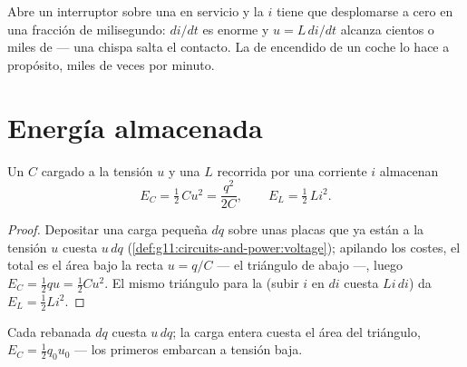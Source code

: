 \begin{remark}\label{rem:g12:rc-rl-circuits:spark}
Abre un interruptor sobre una  en servicio y la $i$ tiene que desplomarse a cero
en una fracción de milisegundo: $di/dt$ es enorme y $u = L\,di/dt$ alcanza cientos o
miles de  --- una chispa salta el contacto. La  de encendido de un coche
lo hace a propósito, miles de veces por minuto.
\end{remark}

\section{Energía almacenada}

\begin{proposition}\label{prop:g12:rc-rl-circuits:energy}
Un  $C$ cargado a la tensión $u$ y una  $L$ recorrida por una
corriente $i$ almacenan
\[
E_C = \tfrac12\,C u^2 = \frac{q^2}{2C},
\qquad
E_L = \tfrac12\,L i^2 .
\]
\end{proposition}

\begin{proof}
Depositar una carga pequeña $dq$ sobre unas placas que ya están a la tensión $u$
cuesta $u\,dq$ (\cref{def:g11:circuits-and-power:voltage}); apilando los costes, el
total es el área bajo la recta $u = q/C$ --- el triángulo de abajo ---, luego
$E_C = \tfrac12 qu = \tfrac12 Cu^2$. El mismo triángulo para la  (subir $i$ en
$di$ cuesta $Li\,di$) da $E_L = \tfrac12 Li^2$.
\end{proof}

\begin{omfigure}

{\small Cada rebanada $dq$ cuesta $u\,dq$; la carga entera cuesta el área del
triángulo, $E_C = \tfrac12 q_0 u_0$ --- los primeros  embarcan a tensión
baja.}
\end{omfigure}

